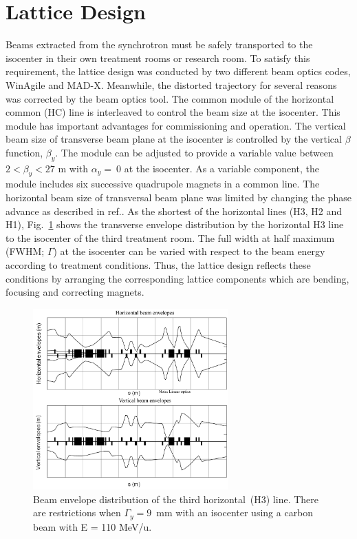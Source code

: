 \documentclass[jkps,preprint,fleqn,showpacs,showkeys]{revtex4}
\begin{document}
\section{Lattice Design}
\label{sec:Lat}
Beams extracted from the synchrotron must be safely transported to the isocenter in their own treatment rooms or research room.
To satisfy this requirement, the lattice design was conducted by two different beam optics codes, WinAgile\cite{Agile0,Agile1} and MAD-X\cite{Schmidt}.
Meanwhile, the distorted trajectory for several reasons was corrected by the beam optics tool\cite{Chawon}.
The common module of the horizontal common (HC) line is interleaved to control the beam size at the isocenter.
This module has important advantages for commissioning and operation. 
The vertical beam size of transverse beam plane at the isocenter is controlled by the vertical $\beta$ function, $\beta_{y}$.  
The module can be adjusted to provide a variable value between $2 < \beta_{y} < 27$ m with $\alpha_{y} = ~0$ at the isocenter. 
As a variable component, the module includes six successive quadrupole magnets in a common line.
The horizontal beam size of transversal beam plane was limited by changing the phase advance as described in ref.\cite{Chawon}. 
As the shortest of the horizontal lines (H3, H2 and H1), 
Fig.~\ref{fig1} shows the transverse envelope distribution by the horizontal H3 line to the isocenter of the third treatment room. 
The full width at half maximum (FWHM; $\Gamma$) at the isocenter can be varied with respect to the beam energy according to treatment conditions.
Thus, the lattice design reflects these conditions by arranging the corresponding lattice components which are bending, focusing and correcting magnets.
\begin{figure}[h]
  \begin{center}
    \includegraphics[width=7.5cm]{Fig02.png}  
    \caption{Beam envelope distribution of the third horizontal~(H3) line.
      There are restrictions when $\Gamma_{y} = 9$~mm with an isocenter using a carbon beam with E = 110 MeV/u.}
    \label{fig1}
  \end{center}
\end{figure}
\end{document}

